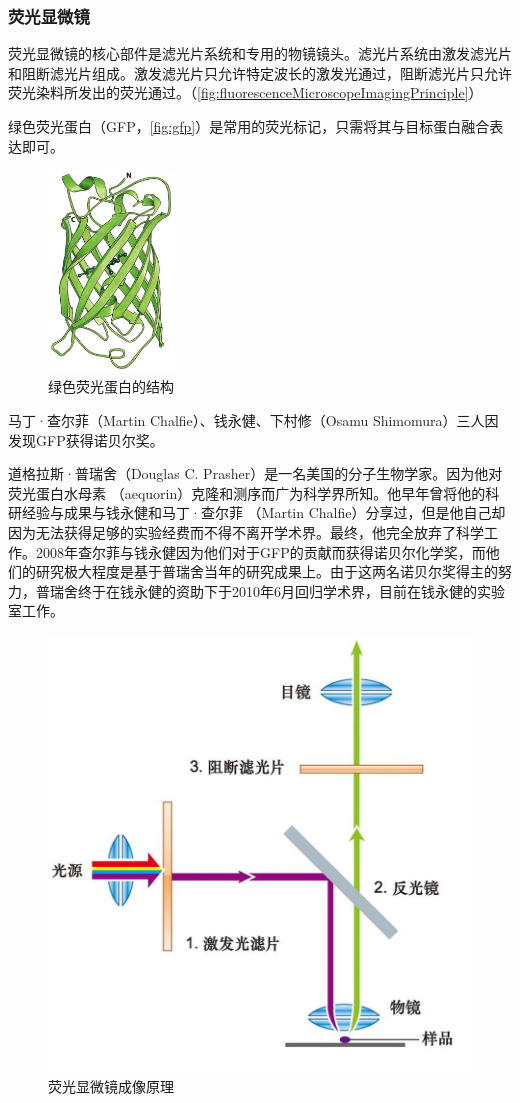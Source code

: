 \subsubsection{荧光显微镜}

荧光显微镜的核心部件是滤光片系统和专用的物镜镜头。滤光片系统由激发滤光片和阻断滤光片组成。激发滤光片只允许特定波长的激发光通过，阻断滤光片只允许荧光染料所发出的荧光通过。（\autoref{fig:fluorescenceMicroscopeImagingPrinciple}）

绿色荧光蛋白（GFP，\autoref{fig:gfp}）是常用的荧光标记，只需将其与目标蛋白融合表达即可。

\begin{figure}[htbp]
	\centering
	\includegraphics[width=0.3\textwidth]{Pics/GFP}
	\caption{绿色荧光蛋白的结构}
	\label{fig:gfp}
\end{figure}

\begin{gs}[：GFP与诺贝尔奖]

	\hspace{2em}马丁·查尔菲（Martin Chalfie）、钱永健、下村修（Osamu Shimomura）三人因发现GFP获得诺贝尔奖。

	\hspace{2em}道格拉斯·普瑞舍（Douglas C. Prasher）是一名美国的分子生物学家。因为他对荧光蛋白水母素 （aequorin）克隆和测序而广为科学界所知。他早年曾将他的科研经验与成果与钱永健和马丁·查尔菲 （Martin Chalfie）分享过，但是他自己却因为无法获得足够的实验经费而不得不离开学术界。最终，他完全放弃了科学工作。2008年查尔菲与钱永健因为他们对于GFP的贡献而获得诺贝尔化学奖，而他们的研究极大程度是基于普瑞舍当年的研究成果上。由于这两名诺贝尔奖得主的努力，普瑞舍终于在钱永健的资助下于2010年6月回归学术界，目前在钱永健的实验室工作。
\end{gs}

\begin{figure}[htbp]
	\centering
	\includegraphics[width=0.4\linewidth]{Pics/荧光显微镜成像原理}
	\caption{荧光显微镜成像原理}
	\label{fig:fluorescenceMicroscopeImagingPrinciple}
\end{figure}

